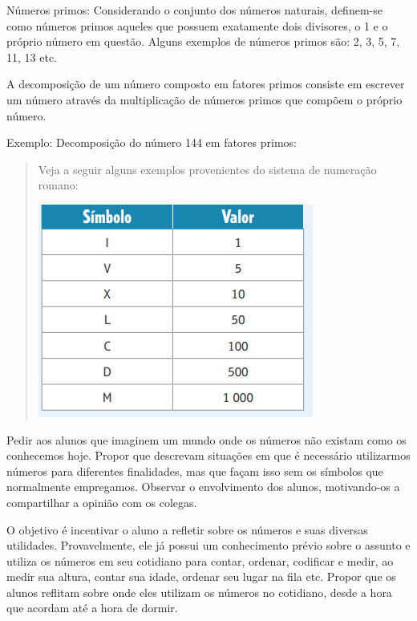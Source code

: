 Números primos: Considerando o conjunto dos números naturais, definem-se
como números primos aqueles que possuem exatamente dois divisores, o 1 e
o próprio número em questão. Alguns exemplos de números primos são: 2,
3, 5, 7, 11, 13 etc.

A decomposição de um número composto em fatores primos consiste em
escrever um número através da multiplicação de números primos que
compõem o próprio número.

Exemplo: Decomposição do número 144 em fatores primos: 


\begin{quote}
Veja a seguir alguns exemplos provenientes do sistema de numeração
romano:


\includegraphics[width=3.5625in,height=2.76042in]{./imgSAEB_6_MAT/media/image5.png}
\end{quote}

Pedir aos alunos que imaginem um mundo onde os números não existam como
os conhecemos hoje. Propor que descrevam situações em que é necessário
utilizarmos números para diferentes finalidades, mas que façam isso sem
os símbolos que normalmente empregamos. Observar o envolvimento dos
alunos, motivando-os a compartilhar a opinião com os colegas.

O objetivo é incentivar o aluno a refletir sobre os números e suas
diversas utilidades. Provavelmente, ele já possui um conhecimento prévio
sobre o assunto e utiliza os números em seu cotidiano para contar,
ordenar, codificar e medir, ao medir sua altura, contar sua idade,
ordenar seu lugar na fila etc. Propor que os alunos reflitam sobre onde
eles utilizam os números no cotidiano, desde a hora que acordam até a
hora de dormir.

